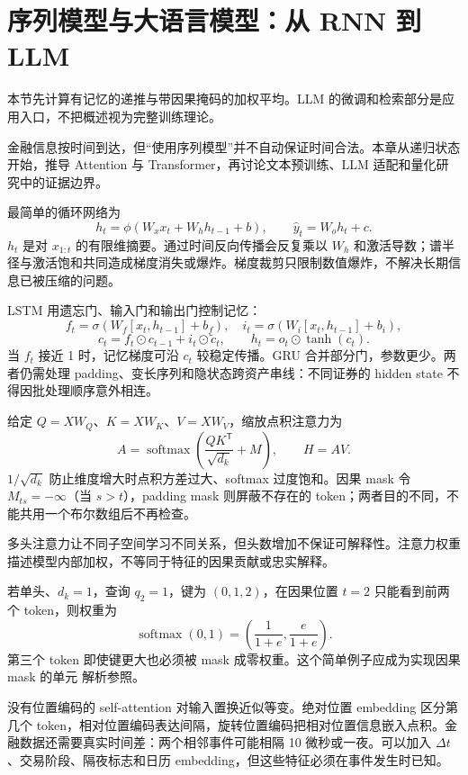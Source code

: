 \section{序列模型与大语言模型：从 RNN 到 LLM}
\label{ch:lower-ml-sequence}

本节先计算有记忆的递推与带因果掩码的加权平均。LLM 的微调和检索部分是应用入口，不把概述视为完整训练理论。


金融信息按时间到达，但“使用序列模型”并不自动保证时间合法。本章从递归状态开始，推导 Attention 与 Transformer，再讨论文本预训练、LLM 适配和量化研究中的证据边界。


最简单的循环网络为
\[
h_t=\phi(W_xx_t+W_hh_{t-1}+b),\qquad
\hat y_t=W_oh_t+c.
\]
$h_t$ 是对 $x_{1:t}$ 的有限维摘要。通过时间反向传播会反复乘以 $W_h$ 和激活导数；谱半径与激活饱和共同造成梯度消失或爆炸。梯度裁剪只限制数值爆炸，不解决长期信息已被压缩的问题。

LSTM 用遗忘门、输入门和输出门控制记忆：
\[
f_t=\sigma(W_f[x_t,h_{t-1}]+b_f),\quad
i_t=\sigma(W_i[x_t,h_{t-1}]+b_i),
\]
\[
c_t=f_t\odot c_{t-1}+i_t\odot\tilde c_t,
\qquad h_t=o_t\odot\tanh(c_t).
\]
当 $f_t$ 接近 1 时，记忆梯度可沿 $c_t$ 较稳定传播。GRU 合并部分门，参数更少。两者仍需处理 padding、变长序列和隐状态跨资产串线：不同证券的 hidden state 不得因批处理顺序意外相连。


给定 $Q=XW_Q$、$K=XW_K$、$V=XW_V$，缩放点积注意力为
\[
A=\operatorname{softmax}\!\left(\frac{QK^{\mathsf T}}{\sqrt{d_k}}+M\right),
\qquad H=AV.
\]
$1/\sqrt{d_k}$ 防止维度增大时点积方差过大、softmax 过度饱和。因果 mask 令 $M_{ts}=-\infty$（当 $s>t$），padding mask 则屏蔽不存在的 token；两者目的不同，不能共用一个布尔数组后不再检查。



多头注意力让不同子空间学习不同关系，但头数增加不保证可解释性。注意力权重描述模型内部加权，不等同于特征的因果贡献或忠实解释。


若单头、$d_k=1$，查询 $q_2=1$，键为 $(0,1,2)$，在因果位置 $t=2$ 只能看到前两个 token，则权重为
\[
\operatorname{softmax}(0,1)=
\left(\frac1{1+e},\frac e{1+e}\right).
\]
第三个 token 即使键更大也必须被 mask 成零权重。这个简单例子应成为实现因果 mask 的单元 解析参照。


没有位置编码的 self-attention 对输入置换近似等变。绝对位置 embedding 区分第几个 token，相对位置编码表达间隔，旋转位置编码把相对位置信息嵌入点积。金融数据还需要真实时间差：两个相邻事件可能相隔 10 微秒或一夜。可以加入 $\Delta t$、交易阶段、隔夜标志和日历 embedding，但这些特征必须在事件发生时已知。

